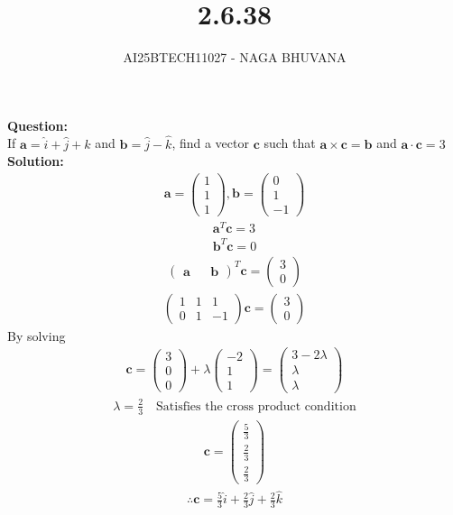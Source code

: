 \documentclass{beamer}
\title{2.6.38}
\author{AI25BTECH11027 - NAGA BHUVANA}
\theoremstyle{remark}
\newcommand{\myvec}[1]{\ensuremath{\begin{pmatrix}#1\end{pmatrix}}}
\let\vec\mathbf
\numberwithin{equation}{section}
\begin{document}
{\let\newpage\relax\maketitle}
\renewcommand{\thefigure}{\theenumi}
\renewcommand{\thetable}{\theenumi}
\noindent
		\textbf{Question:}\\
If $\vec{a}=\hat{i}+\hat{j}+\hat{k}$ and $\vec{b}=\hat{j}-\hat{k}$, find a vector $\vec{c}$ such that $\vec{a} \times \vec{c}=\vec{b}$ and $\vec{a} \cdot \vec{c}=3$\\
\textbf{Solution:}\\
\begin{align}
\vec{a}=\myvec{1\\1\\1},\vec{b}=\myvec{0\\1\\-1}
\end{align}
    \begin{align}
        \vec{a}^T\vec{c}=3\\
        \vec{b}^T\vec{c}=0
    \end{align}
    \begin{align}
        \myvec{\vec{a} && \vec{b}}^T\vec{c}=\myvec{3\\0}
    \end{align}
   \begin{align}
       \myvec{1&1&1\\0&1&-1}\vec{c}=\myvec{3\\0}
   \end{align}
   By solving\\
   \begin{align}
       \vec{c}=\myvec{3\\0\\0}+\lambda \myvec{-2\\1\\1}=\myvec{3-2\lambda \\ \lambda \\ \lambda}
   \end{align}
   \begin{align}
	   \lambda=\frac{2}{3} \quad \text{Satisfies the cross product condition}
   \end{align}
\begin{align}
    \vec{c}=\myvec{\frac{5}{3}\\ \frac{2}{3}\\ \frac{2}{3}}
\end{align}
\begin{align}
    \therefore \vec{c}=\frac{5}{3}\hat{i}+\frac{2}{3}\hat{j}+\frac{2}{3}\hat{k}
\end{align}
\end{document}
